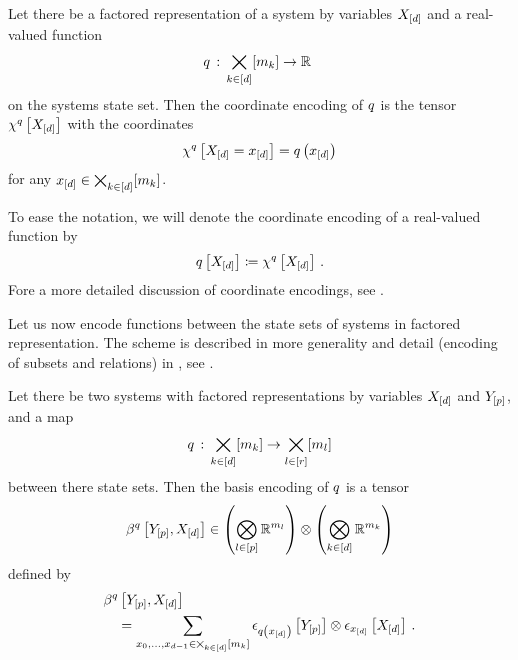\begin{definition}\label{def:notationCoordinateEncoding}
	Let there be a factored representation of a system by variables $X_{[d]}$ and a real-valued function
	\begin{align*}
		q\,:\,\bigtimes_{k\in[d]}[m_{k}] \rightarrow \mathbb{R} \
	\end{align*}
	on the systems state set.
	Then the coordinate encoding of $q$ is the tensor $\chi^{q}\left[X_{[d]}\right]$ with the coordinates
	\begin{align*}
		\chi^{q}\left[X_{[d]}=x_{[d]}\right] = q\left(x_{[d]}\right)
	\end{align*}
	for any $x_{[d]}\in\bigtimes_{k\in[d]}[m_{k}]$.
\end{definition}

To ease the notation, we will denote the coordinate encoding of a real-valued function by
\begin{align*}
	q\left[X_{[d]}\right]
	\coloneqq \chi^{q}\left[X_{[d]}\right] \, .
\end{align*}
Fore a more detailed discussion of coordinate encodings, see .



Let us now encode functions between the state sets of systems in factored representation.
The scheme is described in more generality and detail (encoding of subsets and relations) in , see .

\begin{definition}\label{def:functionRepresentation}
	Let there be two systems with factored representations by variables $X_{[d]}$ and $Y_{[p]}$, and a map
	\begin{align*}
		 q\,:\,\bigtimes_{k\in[d]}[m_{k}] \rightarrow  \bigtimes_{l\in[r]}[m_{l}]
	\end{align*}
	between there state sets.
	Then the basis encoding of $q$ is a tensor
	\begin{align*}
		\beta^{q}\left[Y_{[p]},X_{[d]}\right]
		\in \left(\bigotimes_{l\in[p]} \mathbb{R}^{m_{l}}\right) \otimes \left(\bigotimes_{k\in[d]} \mathbb{R}^{m_{k}}\right)
	\end{align*}
	defined by
	\begin{align*}
		& \beta^{q}\left[Y_{[p]},X_{[d]}\right] \\
		& \quad = \sum_{x_{0},\ldots,x_{d-1}\in\bigtimes_{k\in[d]}[m_{k}]}
		\epsilon_{q\left(x_{[d]}\right)}\left[Y_{[p]}\right] \otimes  \epsilon_{x_{[d]}}\left[X_{[d]}\right] \, .
	\end{align*}
\end{definition}


